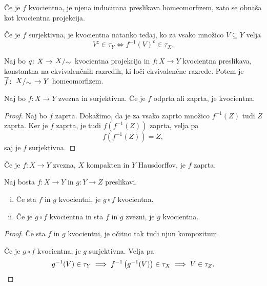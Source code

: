 \begin{opomba}
Če je $f$ kvocientna, je njena inducirana preslikava homeomorfizem,
zato se obnaša kot kvocientna projekcija.
\end{opomba}

\begin{opomba}
Če je $f$ surjektivna, je kvocientna natanko tedaj, ko za vsako
množico $V \subseteq Y$ velja
\[
V^{\mathsf{c}} \in \tau_Y \iff f^{-1}(V)^{\mathsf{c}} \in \tau_X.
\]
\end{opomba}

\begin{izrek}
Naj bo $q \colon X \to \kvoc{X}{\sim}$ kvocientna projekcija in
$f \colon X \to Y$ kvocientna preslikava, konstantna na
ekvivalenčnih razredih, ki loči ekvivalenčne razrede. Potem je
$\overline{f} \colon \kvoc{X}{\sim} \to Y$ homeomorfizem.
\end{izrek}

\obvs

\begin{lema}
Naj bo $f \colon X \to Y$ zvezna in surjektivna. Če je $f$ odprta
ali zaprta, je kvocientna.
\end{lema}

\begin{proof}
Naj bo $f$ zaprta. Dokažimo, da je za vsako zaprto množico
$f^{-1}(Z)$ tudi $Z$ zaprta. Ker je $f$ zaprta, je tudi
$f\left(f^{-1}(Z)\right) $ zaprta, velja pa
\[
f\left(f^{-1}(Z)\right) = Z,
\]
saj je $f$ surjektivna.
\end{proof}

\begin{opomba}
Če je $f \colon X \to Y$ zvezna, $X$ kompakten in $Y$ Hausdorffov,
je $f$ zaprta.
\end{opomba}

\begin{trditev}
Naj bosta $f \colon X \to Y$ in $g \colon Y \to Z$ preslikavi.

\begin{enumerate}[i)]
\item Če sta $f$ in $g$ kvocientni, je $g \circ f$ kvocientna.
\item Če je $g \circ f$ kvocientna in sta $f$ in $g$ zvezni, je $g$
kvocientna.
\end{enumerate}
\end{trditev}

\begin{proof}
Če sta $f$ in $g$ kvocientni, je očitno tak tudi njun kompozitum.

Če je $g \circ f$ kvocientna, je $g$ surjektivna. Velja pa
\[
g^{-1}(V) \in \tau_Y \implies
f^{-1}\left(g^{-1}(V)\right) \in \tau_X \implies
V \in \tau_Z. \qedhere
\]
\end{proof}

